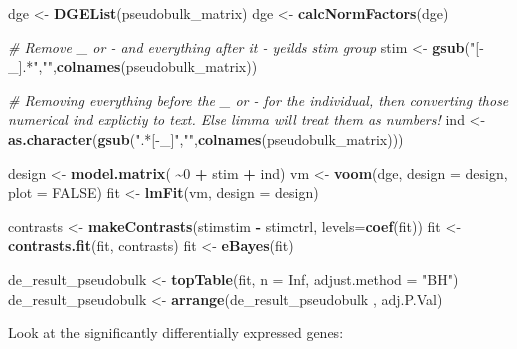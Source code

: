 \documentclass[
]{book}
\newenvironment{Shaded}{\begin{snugshade}}{\end{snugshade}}
\newcommand{\AttributeTok}[1]{\textcolor[rgb]{0.13,0.29,0.53}{#1}}
\newcommand{\CommentTok}[1]{\textcolor[rgb]{0.56,0.35,0.01}{\textit{#1}}}
\newcommand{\ConstantTok}[1]{\textcolor[rgb]{0.56,0.35,0.01}{#1}}
\newcommand{\DecValTok}[1]{\textcolor[rgb]{0.00,0.00,0.81}{#1}}
\newcommand{\FunctionTok}[1]{\textcolor[rgb]{0.13,0.29,0.53}{\textbf{#1}}}
\newcommand{\NormalTok}[1]{#1}
\newcommand{\OtherTok}[1]{\textcolor[rgb]{0.56,0.35,0.01}{#1}}
\newcommand{\SpecialCharTok}[1]{\textcolor[rgb]{0.81,0.36,0.00}{\textbf{#1}}}
\newcommand{\StringTok}[1]{\textcolor[rgb]{0.31,0.60,0.02}{#1}}
\begin{document}
\begin{Shaded}
\begin{Highlighting}[]
\NormalTok{dge }\OtherTok{\textless{}{-}} \FunctionTok{DGEList}\NormalTok{(pseudobulk\_matrix)}
\NormalTok{dge }\OtherTok{\textless{}{-}} \FunctionTok{calcNormFactors}\NormalTok{(dge)}

\CommentTok{\# Remove \_ or {-} and everything after it {-} yeilds stim group}
\NormalTok{stim }\OtherTok{\textless{}{-}} \FunctionTok{gsub}\NormalTok{(}\StringTok{"[{-}\_].*"}\NormalTok{,}\StringTok{""}\NormalTok{,}\FunctionTok{colnames}\NormalTok{(pseudobulk\_matrix)) }

\CommentTok{\# Removing everything before the \_ or {-} for the individual, then converting those numerical ind explictiy to text. Else limma will treat them as numbers!}
\NormalTok{ind  }\OtherTok{\textless{}{-}} \FunctionTok{as.character}\NormalTok{(}\FunctionTok{gsub}\NormalTok{(}\StringTok{".*[{-}\_]"}\NormalTok{,}\StringTok{""}\NormalTok{,}\FunctionTok{colnames}\NormalTok{(pseudobulk\_matrix))) }

\NormalTok{design }\OtherTok{\textless{}{-}} \FunctionTok{model.matrix}\NormalTok{( }\SpecialCharTok{\textasciitilde{}}\DecValTok{0} \SpecialCharTok{+}\NormalTok{ stim }\SpecialCharTok{+}\NormalTok{ ind)}
\NormalTok{vm  }\OtherTok{\textless{}{-}} \FunctionTok{voom}\NormalTok{(dge, }\AttributeTok{design =}\NormalTok{ design, }\AttributeTok{plot =} \ConstantTok{FALSE}\NormalTok{)}
\NormalTok{fit }\OtherTok{\textless{}{-}} \FunctionTok{lmFit}\NormalTok{(vm, }\AttributeTok{design =}\NormalTok{ design)}

\NormalTok{contrasts }\OtherTok{\textless{}{-}} \FunctionTok{makeContrasts}\NormalTok{(stimstim }\SpecialCharTok{{-}}\NormalTok{ stimctrl, }\AttributeTok{levels=}\FunctionTok{coef}\NormalTok{(fit))}
\NormalTok{fit }\OtherTok{\textless{}{-}} \FunctionTok{contrasts.fit}\NormalTok{(fit, contrasts)}
\NormalTok{fit }\OtherTok{\textless{}{-}} \FunctionTok{eBayes}\NormalTok{(fit)}

\NormalTok{de\_result\_pseudobulk }\OtherTok{\textless{}{-}} \FunctionTok{topTable}\NormalTok{(fit, }\AttributeTok{n =} \ConstantTok{Inf}\NormalTok{, }\AttributeTok{adjust.method =} \StringTok{"BH"}\NormalTok{)}
\NormalTok{de\_result\_pseudobulk }\OtherTok{\textless{}{-}} \FunctionTok{arrange}\NormalTok{(de\_result\_pseudobulk , adj.P.Val)}
\end{Highlighting}
\end{Shaded}

Look at the significantly differentially expressed genes:
\end{document}
